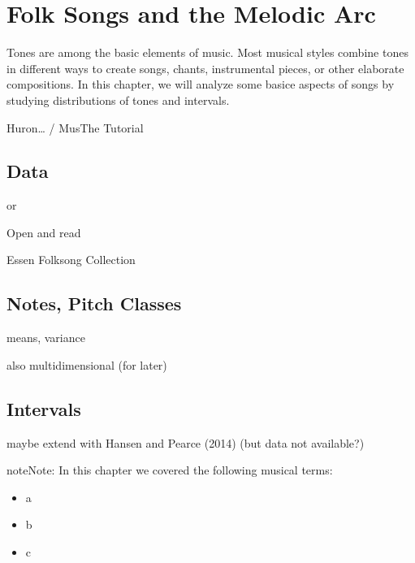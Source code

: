 \documentclass[letterpaper,10pt,english]{sphinxmanual}
\begin{document}
\chapter{Folk Songs and the Melodic Arc}
\label{\detokenize{3_folk_songs:folk-songs-and-the-melodic-arc}}\label{\detokenize{3_folk_songs::doc}}
Tones are among the basic elements of music. Most musical styles combine tones in different ways
to create songs, chants, instrumental pieces, or other elaborate compositions.
In this chapter, we will analyze some basice aspects of songs by studying distributions of tones and intervals.

Huron… / MusThe Tutorial


\section{Data}
\label{\detokenize{3_folk_songs:data}}
or 

Open and read 

Essen Folksong Collection


\section{Notes, Pitch Classes}
\label{\detokenize{3_folk_songs:notes-pitch-classes}}

means, variance

also multidimensional (for later)


\section{Intervals}
\label{\detokenize{3_folk_songs:intervals}}

maybe extend with Hansen and Pearce (2014) (but data not available?)

\begin{sphinxadmonition}{note}{Note:}
In this chapter we covered the following musical terms:
\begin{itemize}
\item {} 
a

\item {} 
b

\item {} 
c

\end{itemize}
\end{sphinxadmonition}
\end{document}
